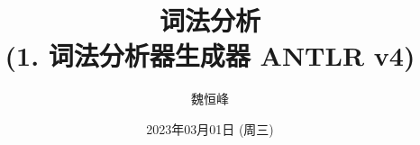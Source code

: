 \documentclass[]{beamer}
\title[词法分析]{词法分析 \\ (1. 词法分析器生成器 ANTLR v4)}
\author[魏恒峰]{\large 魏恒峰}
\institute{hfwei@nju.edu.cn}
\date{2023年03月01日 (周三)}
\begin{document}
\maketitle



\thankyou{}

\end{document}
